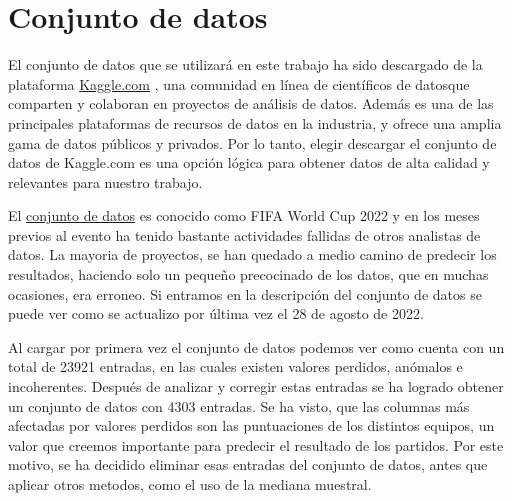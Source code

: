 \section{Conjunto de datos}

El conjunto de datos que se utilizará en este trabajo ha sido descargado de la plataforma \href{https://www.kaggle.com}{Kaggle.com} , una comunidad en línea de científicos de datosque comparten y colaboran en proyectos de análisis de datos. Además es una de las principales plataformas de recursos de datos en la industria, y ofrece una amplia gama de datos públicos y privados. Por lo tanto, elegir descargar el conjunto de datos de Kaggle.com es una opción lógica para obtener datos de alta calidad y relevantes para nuestro trabajo.
\newline

El \href{https://www.kaggle.com/datasets/brenda89/fifa-world-cup-2022}{conjunto de datos} es conocido como FIFA World Cup 2022 y en los meses previos al evento ha tenido bastante actividades fallidas de otros analistas de datos. La mayoria de proyectos, se han quedado a medio camino de predecir los resultados, haciendo solo un pequeño precocinado de los datos, que en muchas ocasiones, era erroneo. Si entramos en la descripción del conjunto de datos se puede ver como se actualizo por última vez el 28 de agosto de 2022.
\newline

Al cargar por primera vez el conjunto de datos podemos ver como cuenta con un total de 23921 entradas, en las cuales existen valores perdidos, anómalos e incoherentes. Después de analizar y corregir estas entradas se ha logrado obtener un conjunto de datos con 4303 entradas. Se ha visto, que las columnas más afectadas por valores perdidos son las puntuaciones de los distintos equipos, un valor que creemos importante para predecir el resultado de los partidos. Por este motivo, se ha decidido eliminar esas entradas del conjunto de datos, antes que aplicar otros metodos, como el uso de la mediana muestral. 
\newline

